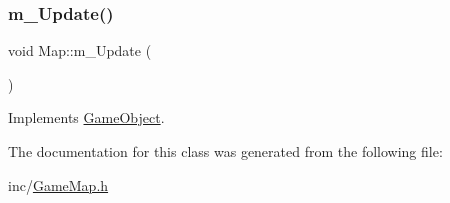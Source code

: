 \mbox{\label{class_map_a50d9a80e029be4f056b8c5d73791b6c4}} 
\subsubsection{\texorpdfstring{m\+\_\+\+Update()}{m\_Update()}}
{\footnotesize\ttfamily void Map\+::m\+\_\+\+Update (\begin{DoxyParamCaption}{ }\end{DoxyParamCaption})\hspace{0.3cm}{\ttfamily [virtual]}}



Implements \mbox{\hyperlink{class_game_object_a3af5a7b470e09f13a1422439fc6a9ba8}{Game\+Object}}.



The documentation for this class was generated from the following file\+:\begin{DoxyCompactItemize}
\item 
inc/\mbox{\hyperlink{_game_map_8h}{Game\+Map.\+h}}\end{DoxyCompactItemize}

